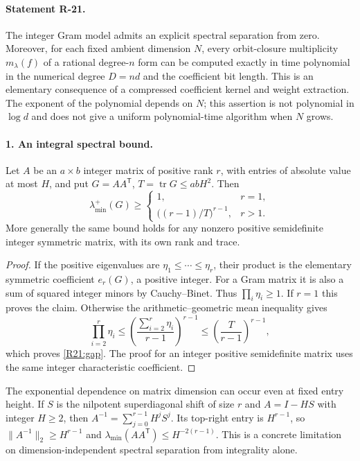 \documentclass[11pt,a4paper]{article}
\theoremstyle{definition}\newtheorem{definition}{Definition}
\begin{document}
\paragraph{Statement R-21.}
The integer Gram model admits an explicit spectral separation from
zero. Moreover, for each fixed ambient dimension $N$, every orbit-closure
multiplicity $m_\lambda(f)$ of a rational degree-$n$ form can be computed
exactly in time polynomial in the numerical degree $D=nd$ and the
coefficient bit length. This is an elementary consequence of a compressed
coefficient kernel and weight extraction. The exponent of the polynomial
depends on $N$; this assertion is not polynomial in $\log d$ and does not
give a uniform polynomial-time algorithm when $N$ grows.

\paragraph{1. An integral spectral bound.}
Let $A$ be an $a\times b$ integer matrix of positive rank $r$, with
entries of absolute value at most $H$, and put $G=AA^{\mathsf T}$,
$T=\operatorname{tr}G\leq abH^2$. Then
\begin{equation}\label{R21:gap}
 \lambda_{\min}^{+}(G)\geq
 \begin{cases}
 1,&r=1,\\[1mm]
 \bigl((r-1)/T\bigr)^{r-1},&r>1.
 \end{cases}
\end{equation}
More generally the same bound holds for any nonzero positive semidefinite
integer symmetric matrix, with its own rank and trace.

\begin{proof}
If the positive eigenvalues are $\eta_1\leq\cdots\leq\eta_r$, their
product is the elementary symmetric coefficient $e_r(G)$, a positive
integer. For a Gram matrix it is also a sum of squared integer minors
by Cauchy--Binet. Thus $\prod_i\eta_i\geq1$.
If $r=1$ this proves the claim. Otherwise the arithmetic--geometric
mean inequality gives
\[
 \prod_{i=2}^r\eta_i\leq
 \left(\frac{\sum_{i=2}^r\eta_i}{r-1}\right)^{r-1}
 \leq\left(\frac{T}{r-1}\right)^{r-1},
\]
which proves \eqref{R21:gap}. The proof for an integer positive
semidefinite matrix uses the same integer characteristic coefficient.
\end{proof}

The exponential dependence on matrix dimension can occur even at fixed
entry height. If $S$ is the nilpotent superdiagonal shift of size $r$
and $A=I-HS$ with integer $H\geq2$, then
$A^{-1}=\sum_{j=0}^{r-1}H^jS^j$. Its top-right entry is $H^{r-1}$,
so $\|A^{-1}\|_2\geq H^{r-1}$ and
$\lambda_{\min}(AA^{\mathsf T})\leq H^{-2(r-1)}$.
This is a concrete limitation on dimension-independent spectral
separation from integrality alone.
\end{document}

